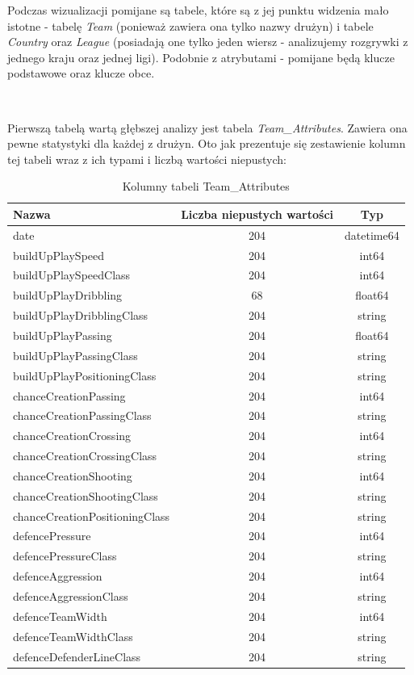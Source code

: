     Podczas wizualizacji pomijane są tabele, które są z jej punktu widzenia mało istotne - tabelę \emph{Team} (ponieważ zawiera ona tylko nazwy drużyn) i tabele \emph{Country} oraz \emph{League} (posiadają one tylko jeden wiersz - analizujemy rozgrywki z jednego kraju oraz jednej ligi). Podobnie z atrybutami - pomijane będą klucze podstawowe oraz klucze obce.
    
    ~
    
    Pierwszą tabelą wartą głębszej analizy jest tabela \emph{Team\_Attributes}. Zawiera ona pewne statystyki dla każdej z drużyn. Oto jak prezentuje się zestawienie kolumn tej tabeli wraz z ich typami i liczbą wartości niepustych:
    
    \begin{table}[H]
    \caption{Kolumny tabeli Team\_Attributes}
    \centering\footnotesize%
    \begin{tabular}{l c c}
    \toprule
        Nazwa & Liczba niepustych wartości & Typ \\
    \midrule
        date & 204 & datetime64 \\
        buildUpPlaySpeed & 204 & int64 \\
        buildUpPlaySpeedClass & 204 & int64 \\
        buildUpPlayDribbling & 68 & float64 \\
        buildUpPlayDribblingClass & 204 & string \\
        buildUpPlayPassing & 204 & float64 \\
        buildUpPlayPassingClass & 204 & string \\
        buildUpPlayPositioningClass & 204 & string \\
        chanceCreationPassing & 204 & int64 \\
        chanceCreationPassingClass & 204 & string \\
        chanceCreationCrossing & 204 & int64 \\ 
        chanceCreationCrossingClass & 204 & string \\        
        chanceCreationShooting & 204 & int64 \\  
        chanceCreationShootingClass & 204 & string \\
        chanceCreationPositioningClass & 204 & string \\
        defencePressure & 204 & int64 \\
        defencePressureClass & 204 & string \\
        defenceAggression & 204 & int64 \\  
        defenceAggressionClass & 204 & string \\
        defenceTeamWidth & 204 & int64 \\
        defenceTeamWidthClass & 204 & string \\
        defenceDefenderLineClass & 204 & string \\
    \bottomrule
    \end{tabular}
    \end{table}
    
